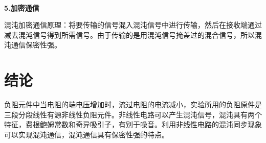 \documentclass[UTF8]{ctexart}
\begin{document}
~\\
\noindent\textbf{5.加密通信}
\begin{figure}[H]
\centering
\end{figure}
混沌加密通信原理：将要传输的信号混入混沌信号中进行传输，然后在接收端通过减去混沌信号得到所需信号。由于传输的是用混沌信号掩盖过的混合信号，所以混沌通信保密性强。

\section{结论}
负阻元件中当电阻的端电压增加时，流过电阻的电流减小，实验所用的负阻原件是三段分段线性有源非线性负阻元件。非线性电路可以产生混沌信号，混沌具有两个特征，费根鲍姆常数和奇异吸引子，有别于噪音。利用非线性电路的混沌同步现象可以实现混沌通信，混沌通信具有保密性强的特点。
\end{document}

